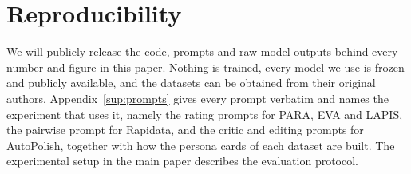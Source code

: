 \documentclass[runningheads]{llncs}
\begin{document}
\section{Reproducibility}
\label{sup:repro}
We will publicly release the code, prompts and raw model outputs behind every number and figure in this paper. Nothing is trained, every model we use is frozen and publicly available, and the datasets can be obtained from their original authors. Appendix~\ref{sup:prompts} gives every prompt verbatim and names the experiment that uses it, namely the rating prompts for PARA, EVA and LAPIS, the pairwise prompt for Rapidata, and the critic and editing prompts for AutoPolish, together with how the persona cards of each dataset are built. The experimental setup in the main paper describes the evaluation protocol.

\fi %
\end{document}
